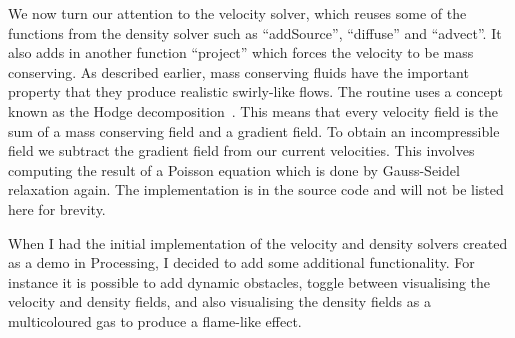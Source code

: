 We now turn our attention to the velocity solver, which reuses some of the functions from the density solver such as ``addSource'', ``diffuse'' and ``advect''.
It also adds in another function ``project'' which forces the velocity to be mass conserving. 
As described earlier, mass conserving fluids have the important property that they produce realistic swirly-like flows.
The routine uses a concept known as the Hodge decomposition~\cite{pirashvili2000hodge}.
This means that every velocity field is the sum of a mass conserving field and a gradient field.
To obtain an incompressible field we subtract the gradient field from our current velocities.
This involves computing the result of a Poisson equation which is done by Gauss-Seidel relaxation again.
The implementation is in the source code and will not be listed here for brevity.

When I had the initial implementation of the velocity and density solvers created as a demo in Processing, I decided to add some additional functionality.
For instance it is possible to add dynamic obstacles, toggle between visualising the velocity and density fields, and also visualising the density fields as a multicoloured gas to produce a flame-like effect.
